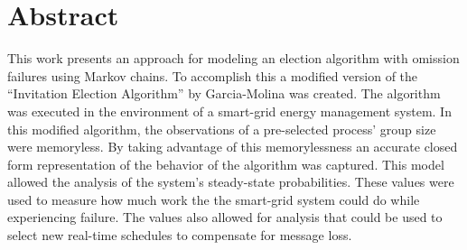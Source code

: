 \section{Abstract}

This work presents an approach for modeling an election algorithm with omission failures using Markov chains.
To accomplish this a modified version of the ``Invitation Election Algorithm'' by Garcia-Molina was created.
The algorithm was executed in the environment of a smart-grid energy management system.
In this modified algorithm, the observations of a pre-selected process' group size were memoryless.
By taking advantage of this memorylessness an accurate closed form representation of the behavior of the algorithm was captured.
This model allowed the analysis of the system's steady-state probabilities.
These values were used to measure how much work the the smart-grid system could do while experiencing failure.
The values also allowed for analysis that could be used to select new real-time schedules to compensate for message loss.
